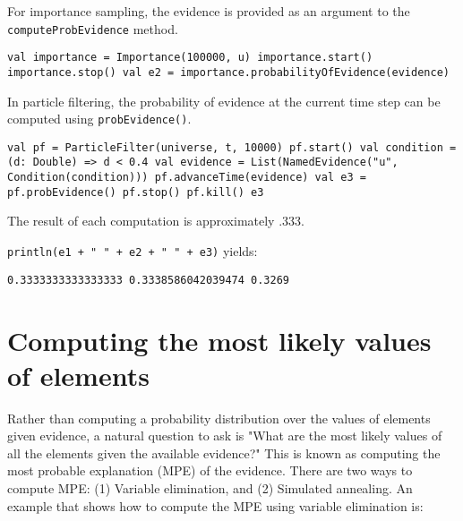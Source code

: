 For importance sampling, the evidence is provided as an argument to the \texttt{computeProbEvidence} method.

\begin{flushleft}
    \texttt{val importance = Importance(100000, u)
    \newline importance.start()
    \newline importance.stop()
    \newline val e2 = importance.probabilityOfEvidence(evidence)
  }
\end{flushleft}

In particle filtering, the probability of evidence at the current time step can be computed using \texttt{probEvidence()}.

\begin{flushleft}
    \texttt{val pf = ParticleFilter(universe, t, 10000)
    \newline pf.start()
    \newline val condition = (d: Double) => d < 0.4
    \newline val evidence = List(NamedEvidence("u", Condition(condition)))
    \newline pf.advanceTime(evidence)
    \newline val e3 = pf.probEvidence()
    \newline pf.stop()
    \newline pf.kill()
    \newline e3
  }
\end{flushleft}

The result of each computation is approximately .333. 

\texttt{println(e1 + " " + e2 + " " + e3)} yields:

\begin{flushleft}
    \texttt{0.3333333333333333 0.3338586042039474 0.3269}
\end{flushleft}


\section{Computing the most likely values of elements}

Rather than computing a probability distribution over the values of elements given evidence, a natural question to ask is "What are the most likely values of all the elements given the available evidence?" This is known as computing the most probable explanation (MPE) of the evidence. There are two ways to compute MPE: (1) Variable elimination, and (2) Simulated annealing. An example that shows how to compute the MPE using variable elimination is:

